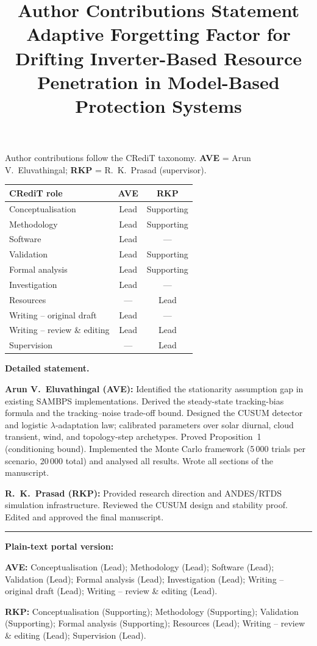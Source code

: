 \documentclass[11pt,a4paper]{article}
\title{Author Contributions Statement\\[4pt]
       \large Adaptive Forgetting Factor for Drifting Inverter-Based Resource
       Penetration in Model-Based Protection Systems}
\author{}
\date{}
\begin{document}
\maketitle\thispagestyle{empty}

\noindent
Author contributions follow the CRediT taxonomy.
\textbf{AVE} = Arun V.\ Eluvathingal; \textbf{RKP} = R.\ K.\ Prasad (supervisor).

\bigskip
\begin{tabular}{@{}lcc@{}}
\toprule
\textbf{CRediT role} & \textbf{AVE} & \textbf{RKP} \\
\midrule
Conceptualisation        & Lead   & Supporting \\
Methodology              & Lead   & Supporting \\
Software                 & Lead   & ---        \\
Validation               & Lead   & Supporting \\
Formal analysis          & Lead   & Supporting \\
Investigation            & Lead   & ---        \\
Resources                & ---    & Lead       \\
Writing -- original draft & Lead   & ---        \\
Writing -- review \& editing & Lead & Lead     \\
Supervision              & ---    & Lead       \\
\bottomrule
\end{tabular}

\bigskip\noindent\textbf{Detailed statement.}

\medskip\noindent\textbf{Arun V.\ Eluvathingal (AVE):}
Identified the stationarity assumption gap in existing SAMBPS implementations.
Derived the steady-state tracking-bias formula and the tracking--noise
trade-off bound.  Designed the CUSUM detector and logistic $\lambda$-adaptation
law; calibrated parameters over solar diurnal, cloud transient, wind, and
topology-step archetypes.  Proved Proposition~1 (conditioning bound).
Implemented the Monte Carlo framework (5\,000 trials per scenario, 20\,000
total) and analysed all results.  Wrote all sections of the manuscript.

\medskip\noindent\textbf{R.\ K.\ Prasad (RKP):}
Provided research direction and ANDES/RTDS simulation infrastructure.
Reviewed the CUSUM design and stability proof.  Edited and approved the
final manuscript.

\bigskip\noindent\rule{0.5\textwidth}{0.4pt}

\bigskip\noindent\textbf{Plain-text portal version:}

\medskip\begin{minipage}{\textwidth}\small
\textbf{AVE:} Conceptualisation (Lead); Methodology (Lead); Software (Lead);
Validation (Lead); Formal analysis (Lead); Investigation (Lead);
Writing -- original draft (Lead); Writing -- review \& editing (Lead).

\medskip\textbf{RKP:} Conceptualisation (Supporting); Methodology (Supporting);
Validation (Supporting); Formal analysis (Supporting); Resources (Lead);
Writing -- review \& editing (Lead); Supervision (Lead).
\end{minipage}
\end{document}
